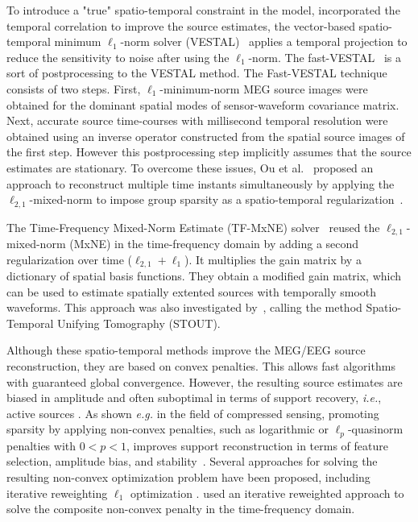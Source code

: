 To introduce a "true" spatio-temporal constraint in the model, \cite{zhang2011sparse,zhang2011iterative} incorporated the temporal correlation to improve the source estimates, the vector-based spatio-temporal minimum $\ell_1$-norm solver (VESTAL)~\cite{huang2006vector} applies a temporal projection to reduce the sensitivity to noise after using the $\ell_1$-norm. The fast-VESTAL~\cite{huang2014meg} is a sort of postprocessing to the VESTAL method. The Fast-VESTAL technique consists of two steps. First, $\ell_1$-minimum-norm MEG source images were obtained for the dominant spatial modes of sensor-waveform covariance matrix. Next, accurate source time-courses with millisecond temporal resolution were obtained using an inverse operator constructed from the spatial source images of the first step. However this postprocessing step implicitly assumes that the source estimates are stationary. To overcome these issues, Ou et al.~\cite{Ou-etal:2009} proposed an approach to reconstruct multiple time instants simultaneously by applying the $\ell_{2,1}$-mixed-norm to impose group sparsity as a spatio-temporal regularization~\cite{gramfort2012mixed,Ou-etal:2009}.

The Time-Frequency Mixed-Norm Estimate (TF-MxNE) solver~\cite{gramfort2013time} reused the $\ell_{2,1}$-mixed-norm (MxNE) in the time-frequency domain by adding a second regularization over time ($\ell_{2,1} + \ell_1$). It multiplies the gain matrix by a dictionary of spatial basis functions. They obtain a modified gain matrix, which can be used to estimate spatially extented sources with temporally smooth waveforms. This approach was also investigated by~\cite{castano2015solving}, calling the method Spatio-Temporal Unifying Tomography (STOUT).

Although these spatio-temporal methods improve the MEG/EEG source reconstruction, they are based on convex penalties. This allows fast algorithms with guaranteed global convergence. However, the resulting source estimates are biased in amplitude and often suboptimal in terms of support recovery, \textit{i.e.}, active sources \cite{candes2008enhancing}. As shown \textit{e.g.} in the field of compressed sensing, promoting sparsity by applying non-convex penalties, such as logarithmic or  $\ell_p$-quasinorm penalties with $0<p<1$, improves support reconstruction in terms of feature selection, amplitude bias, and stability~\cite{candes2008enhancing,chartrand2007exact,saab2008stable}. Several approaches for solving the resulting non-convex optimization problem have been proposed, including iterative reweighting $\ell_1$ optimization \cite{candes2008enhancing}. \cite{strohmeier2014iterative} used an iterative reweighted approach to solve the composite non-convex penalty in the time-frequency domain.

